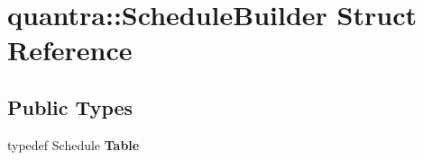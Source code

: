 \hypertarget{structquantra_1_1ScheduleBuilder}{}\section{quantra\+:\+:Schedule\+Builder Struct Reference}
\label{structquantra_1_1ScheduleBuilder}
\subsection*{Public Types}
\begin{DoxyCompactItemize}
\item 
\mbox{\label{structquantra_1_1ScheduleBuilder_a810d966d1070c9bc6ba1b1b83cab5799}} 
typedef Schedule {\bfseries Table}
\end{DoxyCompactItemize}
